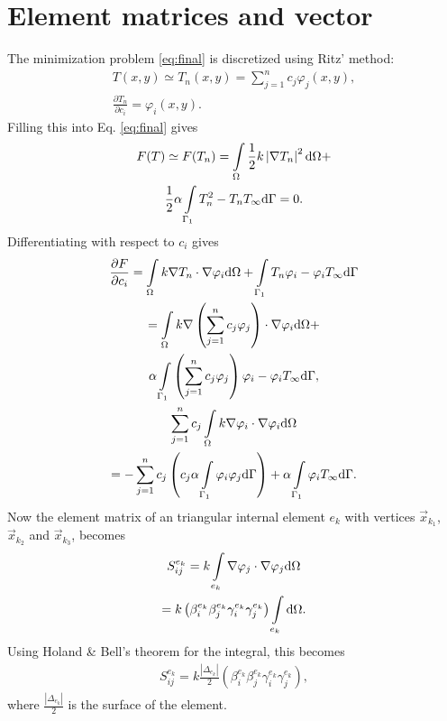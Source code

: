 \section{Element matrices and vector}\label{sec:elem}
The minimization problem \ref{eq:final} is discretized using Ritz' method:
\begin{gather*}
    T(x,y) \simeq T_n(x,y)=\sum_{j=1}^n c_j\varphi_j(x,y),\\
    \frac{\partial T_n}{\partial c_i}=\varphi_i(x,y).
\end{gather*} Filling this into Eq. \ref{eq:final} gives
\begin{gather*}
    F(T)\simeq F(T_n) = \int\displaylimits_{\Omega}\frac{1}{2} k \left|\nabla T_n\right|^2 \mathrm{d}\Omega + \\ \frac{1}{2}\alpha\int\displaylimits_{\Gamma_1}T_n^2-T_nT_{\infty} \mathrm{d}\Gamma = 0.
\end{gather*} Differentiating with respect to $c_i$ gives
\begin{gather*}
    \frac{\partial F}{\partial c_i} = \int\displaylimits_{\Omega}k\nabla T_n\cdot\nabla\varphi_i \mathrm{d}\Omega    +\int\displaylimits_{\Gamma_1}T_n\varphi_i-\varphi_iT_{\infty} \mathrm{d}\Gamma\\
    = \int\displaylimits_{\Omega}k\nabla\left(\sum_{j=1}^n c_j \varphi_j\right)\cdot \nabla \varphi_i \mathrm{d}\Omega + \\ \alpha\int\displaylimits_{\Gamma_1} \left(\sum_{j=1}^n c_j \varphi_j\right)\varphi_i - \varphi_i T_{\infty} \mathrm{d}\Gamma,\\
    \sum_{j=1}^n c_j \int\displaylimits_{\Omega}k\nabla\varphi_i\cdot \nabla \varphi_i \mathrm{d}\Omega \\
    = - \sum_{j=1}^n c_j\left(c_j\alpha\int\displaylimits_{\Gamma_1} \varphi_i \varphi_j \mathrm{d}\Gamma \right)+\alpha\int\displaylimits_{\Gamma_1}\varphi_i T_{\infty} \mathrm{d}\Gamma.
\end{gather*} Now the element matrix of an triangular internal element $e_k$ with vertices $\vec{x}_{k_1}$, $\vec{x}_{k_2}$ and $\vec{x}_{k_3}$, becomes
\begin{gather*}
    S_{ij}^{e_k} =  k\int\displaylimits_{e_k} \nabla \varphi_j \cdot \nabla \varphi_j \mathrm{d}\Omega \\
    = k\left(\beta_i^{e_k} \beta_j^{e_k} \gamma_i^{e_k} \gamma_j^{e_k} \right)\int\displaylimits_{e_k} \mathrm{d}\Omega.
\end{gather*} Using Holand \& Bell's theorem for the integral, this becomes
\begin{gather}
    S_{ij}^{e_k} = k \frac{|\Delta_{e_k}|}{2}\left(\beta_i^{e_k} \beta_j^{e_k} \gamma_i^{e_k} \gamma_j^{e_k} \right),
\end{gather} where $\frac{|\Delta_{e_k}|}{2}$ is the surface of the element.

